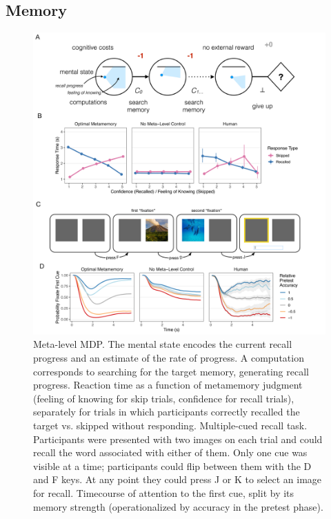 \documentclass[11pt,a4paperpaper,]{article}
\begin{document}
\subsection{Memory}

\begin{figure}[ph]
  \centering
  \includegraphics[width=\textwidth]{diagrams/precis/memory.pdf}
  \caption{
     Meta-level MDP. The mental state encodes the current recall progress and an estimate of the rate of progress. A computation corresponds to searching for the target memory, generating recall progress.
     Reaction time as a function of metamemory judgment (feeling of knowing for skip trials, confidence for recall trials), separately for trials in which participants correctly recalled the target vs. skipped without responding.%
     Multiple-cued recall task. Participants were presented with two images on each trial and could recall the word associated with either of them. Only one cue was visible at a time; participants could flip between them with the D and F keys. At any point they could press J or K to select an image for recall.
     Timecourse of attention to the first cue, split by its memory strength (operationalized by accuracy in the pretest phase).
  }
  \label{fig:memory}
\end{figure}
\end{document}
